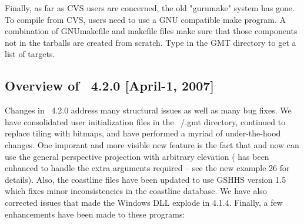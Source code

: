 Finally, as far as CVS users are concerned, the old "gurumake" system has gone. To compile from CVS, users need to use a GNU
compatible make program. A combination of GNUmakefile and makefile files make sure that those components not in the
tarballs are created from scratch. Type  in the GMT directory to get a list of targets.


\subsection{Overview of \gmt\ 4.2.0 [April-1, 2007]}

Changes in \GMT\ 4.2.0 address many structural issues as well as many bug fixes.  We have consolidated
user initialization files in the ~/.gmt directory, continued to replace tiling with bitmaps,
and have performed a myriad of under-the-hood changes. One imporant and more visible
new feature is the fact that  and  now can use the general perspective
projection with arbitrary elevation ( has been enhanced to handle the extra arguments required
-- see the new example 26 for details).
Also, the coastline files have been updated to use GSHHS version 1.5 which fixes minor inconsistencies
in the coastline database.  We have also corrected issues that made the Windows DLL explode in 4.1.4.
Finally, a few enhancements have been made to these programs:

